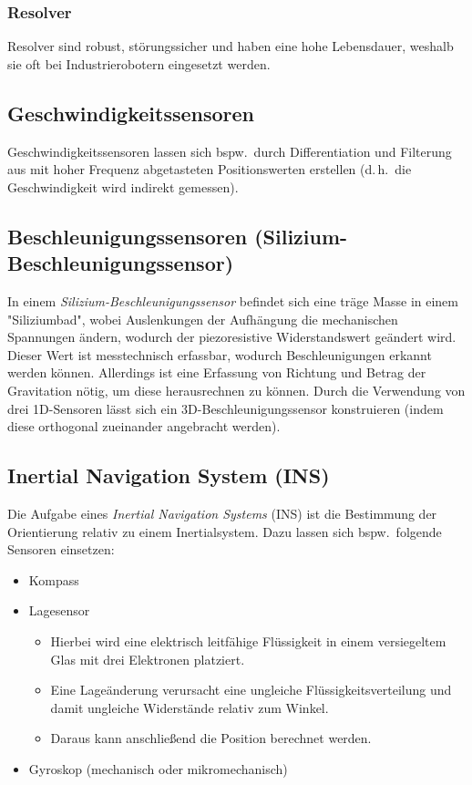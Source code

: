\documentclass[a4paper, 11pt, accentcolor = tud3b]{tudreport}
\renewcommand{\dh}{d.\,h.~}
\newcommand{\bspw}{bspw.~}
\begin{document}
				\subsubsection{Resolver} %
					
					Resolver sind robust, störungssicher und haben eine hohe Lebensdauer, weshalb sie oft bei Industrierobotern eingesetzt werden.

			\subsection{Geschwindigkeitssensoren}
				Geschwindigkeitssensoren lassen sich \bspw durch Differentiation und Filterung aus mit hoher Frequenz abgetasteten Positionswerten erstellen (\dh die Geschwindigkeit wird indirekt gemessen).

			\subsection{Beschleunigungssensoren (Silizium-Beschleunigungssensor)}
				In einem \emph{Silizium-Beschleunigungssensor} befindet sich eine träge Masse in einem "Siliziumbad", wobei Auslenkungen der Aufhängung die mechanischen Spannungen ändern, wodurch der piezoresistive Widerstandswert geändert wird. Dieser Wert ist messtechnisch erfassbar, wodurch Beschleunigungen erkannt werden können. Allerdings ist eine Erfassung von Richtung und Betrag der Gravitation nötig, um diese herausrechnen zu können. Durch die Verwendung von drei 1D-Sensoren lässt sich ein 3D-Beschleunigungssensor konstruieren (indem diese orthogonal zueinander angebracht werden).

			\subsection{Inertial Navigation System (INS)} %
				Die Aufgabe eines \emph{Inertial Navigation Systems} (INS) ist die Bestimmung der Orientierung relativ zu einem Inertialsystem. Dazu lassen sich \bspw folgende Sensoren einsetzen:
				\begin{itemize}
					\item Kompass
					\item Lagesensor
						\begin{itemize}
							\item Hierbei wird eine elektrisch leitfähige Flüssigkeit in einem versiegeltem Glas mit drei Elektronen platziert.
							\item Eine Lageänderung verursacht eine ungleiche Flüssigkeitsverteilung und damit ungleiche Widerstände relativ zum Winkel.
							\item Daraus kann anschließend die Position berechnet werden.
						\end{itemize}
					\item Gyroskop (mechanisch oder mikromechanisch)
				\end{itemize}
\end{document}
